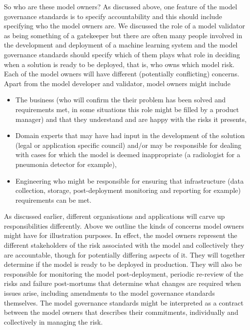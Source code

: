 So who are these model owners? As discussed above, one feature of the model governance standards is to specify accountability and this should include specifying who the model owners are. We discussed the role of a model validator as being something of a gatekeeper but there are often many people involved in the development and deployment of a machine learning system and the model governance standards should specify which of them plays what role in deciding when a solution is ready to be deployed, that is, who owns which model risk. Each of the model owners will have different (potentially conflicting) concerns. Apart from the model developer and validator, model owners might include
%
\begin{itemize}[leftmargin=*]
\item The business (who will confirm the their problem has been solved and requirements met, in some situations this role might be filled by a product manager) and that they understand and are happy with the risks it presents,
\item Domain experts that may have had input in the development of the solution (legal or application specific council) and/or may be responsible for dealing with cases for which the model is deemed inappropriate (a radiologist for a pneumonia detector for example),
\item Engineering who might be responsible for ensuring that infrastructure (data collection, storage, post-deployment monitoring and reporting for example) requirements can be met.
\end{itemize}
%
As discussed earlier, different organisations and applications will carve up responsibilities differently. Above we outline the kinds of concerns model owners might have for illustration purposes. In effect, the model owners represent the different stakeholders of the risk associated with the model and collectively they are accountable, though for potentially differing aspects of it. They will together determine if the model is ready to be deployed in production. They will also be responsible for monitoring the model post-deployment, periodic re-review of the risks and failure post-mortums that determine what changes are required when issues arise, including amendments to the model governance standards themselves. The model governance standards might be interpreted as a contract between the model owners that describes their commitments, individually and collectively in managing the risk.

